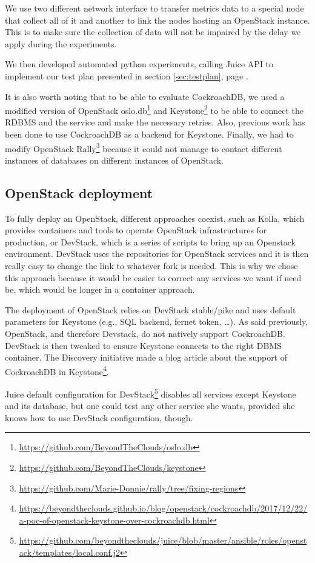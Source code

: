 We use two different network interface to transfer metrics data to a special node that collect all of it and another to link the nodes hosting an OpenStack instance. This is to make sure the collection of data will not be impaired by the delay we apply during the experiments.

We then developed automated python experiments, calling Juice API to implement our test plan presented in section \ref{sec:testplan}, page \pageref{sec:testplan}.

It is also worth noting that to be able to evaluate CockroachDB, we used a modified version of OpenStack oslo.db\footnote{\url{https://github.com/BeyondTheClouds/oslo.db}} and Keystone\footnote{\url{https://github.com/BeyondTheClouds/keystone}} to be able to connect the RDBMS and the service and make the necessary retries. Also, previous work has been done to use CockroachDB as a backend for Keystone. Finally, we had to modify OpenStack Rally\footnote{\url{https://github.com/Marie-Donnie/rally/tree/fixing-regions}} because it could not manage to contact different instances of databases on different instances of OpenStack.

\subsection{OpenStack deployment}

To fully deploy an OpenStack, different approaches coexist, such as Kolla, which provides containers and tools to operate OpenStack infrastructures for production, or DevStack, which is a series of scripts to bring up an Openstack environment. DevStack uses the repositories for OpenStack services and it is then really easy to change the link to whatever fork is needed. This is why we chose this approach because it would be easier to correct any services we want if need be, which would be longer in a container approach.

The deployment of OpenStack relies on DevStack stable/pike and uses default parameters for Keystone (e.g., SQL backend, fernet token, \dots). As said previously, OpenStack, and therefore Devstack, do not natively support CockroachDB. DevStack is then tweaked to ensure Keystone connects to the right DBMS container. The Discovery initiative made a blog article about the support of CockroachDB in Keystone\footnote{\url{https://beyondtheclouds.github.io/blog/openstack/cockroachdb/2017/12/22/a-poc-of-openstack-keystone-over-cockroachdb.html}}.

Juice default configuration for DevStack\footnote{\url{https://github.com/beyondtheclouds/juice/blob/master/ansible/roles/openstack/templates/local.conf.j2}} disables all services except Keystone and its database, but one could test any other service she wants, provided she knows how to use DevStack configuration, though.


